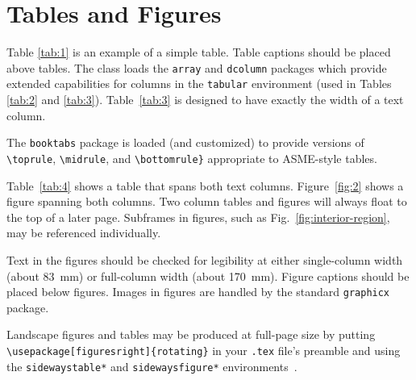 \documentclass[largesc,upint,varvw,barcolor=Red4,nocopyright,hyphenate,balance,lang-second=french,lang=english]{asmejour}
\begin{document}
\section{Tables and Figures}

Table \ref{tab:1} is an example of a simple table. Table captions should be placed above tables.
The class loads the \texttt{array} and \texttt{dcolumn} packages which provide extended capabilities for columns in the \texttt{tabular} environment (used in Tables \ref{tab:2} and \ref{tab:3}). Table~\ref{tab:3} is designed to have exactly the width of a text column. 

The \texttt{booktabs} package \cite{fear} is loaded (and customized) to provide versions of \verb|\toprule|, \verb|\midrule|, and \verb|\bottomrule}| appropriate to ASME-style tables.

Table~\ref{tab:4} shows a table that spans both text columns. Figure~\ref{fig:2} shows a figure spanning both columns. Two column tables and figures will always float to the top of a later page. Subframes in figures, such as  Fig.~\ref{fig:interior-region}, may be referenced individually.

Text in the figures should be checked for legibility at either single-column width (about 83~mm) or full-column width (about 170~mm).  Figure captions should be placed below figures. Images in figures are handled by the standard \texttt{graphicx} package.

Landscape figures and tables may be produced at full-page size by putting \verb|\usepackage[figuresright]{rotating}| in your \texttt{.tex} file's preamble and using the \texttt{sidewaystable*} and \texttt{sidewaysfigure*} environments~\cite{fairbairns}.



\begin{table}[t]
\caption{A simple table\label{tab:1}}
%
\end{table}

\end{document}
